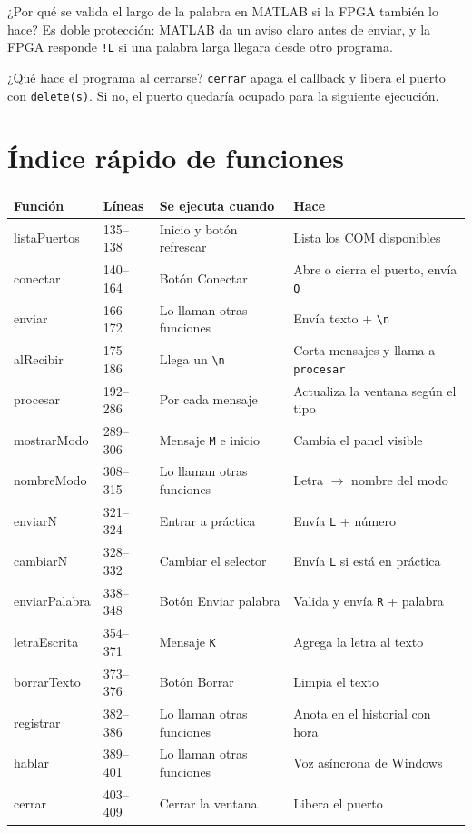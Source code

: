 \documentclass[11pt,a4paper]{article}
\newcommand{\cod}[1]{\texttt{#1}}
\begin{document}
\begin{pregunta}{¿Por qué se valida el largo de la palabra en MATLAB si la FPGA también lo hace?}
Es doble protección: MATLAB da un aviso claro antes de enviar, y la FPGA responde
\cod{!L} si una palabra larga llegara desde otro programa.
\end{pregunta}

\begin{pregunta}{¿Qué hace el programa al cerrarse?}
\cod{cerrar} apaga el callback y libera el puerto con \cod{delete(s)}. Si no, el
puerto quedaría ocupado para la siguiente ejecución.
\end{pregunta}

\appendix
\section{Índice rápido de funciones}
\begin{longtable}{>{\ttfamily}p{3cm} p{1.8cm} p{4cm} p{4.2cm}}
\toprule
\normalfont\textbf{Función} & \textbf{Líneas} & \textbf{Se ejecuta cuando} & \textbf{Hace} \\
\midrule
\endhead
listaPuertos & 135--138 & Inicio y botón refrescar & Lista los COM disponibles \\
conectar & 140--164 & Botón Conectar & Abre o cierra el puerto, envía \cod{Q} \\
enviar & 166--172 & Lo llaman otras funciones & Envía texto + \cod{\textbackslash n} \\
alRecibir & 175--186 & Llega un \cod{\textbackslash n} & Corta mensajes y llama a \cod{procesar} \\
procesar & 192--286 & Por cada mensaje & Actualiza la ventana según el tipo \\
mostrarModo & 289--306 & Mensaje \cod{M} e inicio & Cambia el panel visible \\
nombreModo & 308--315 & Lo llaman otras funciones & Letra $\rightarrow$ nombre del modo \\
enviarN & 321--324 & Entrar a práctica & Envía \cod{L} + número \\
cambiarN & 328--332 & Cambiar el selector & Envía \cod{L} si está en práctica \\
enviarPalabra & 338--348 & Botón Enviar palabra & Valida y envía \cod{R} + palabra \\
letraEscrita & 354--371 & Mensaje \cod{K} & Agrega la letra al texto \\
borrarTexto & 373--376 & Botón Borrar & Limpia el texto \\
registrar & 382--386 & Lo llaman otras funciones & Anota en el historial con hora \\
hablar & 389--401 & Lo llaman otras funciones & Voz asíncrona de Windows \\
cerrar & 403--409 & Cerrar la ventana & Libera el puerto \\
\bottomrule
\end{longtable}
\end{document}

